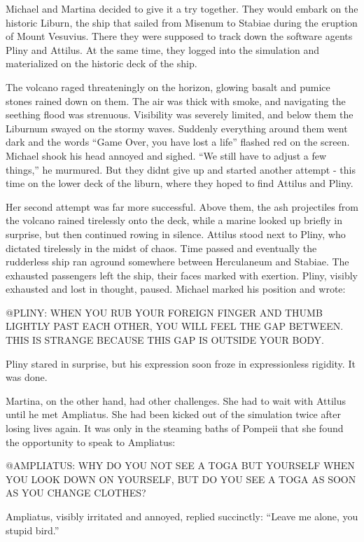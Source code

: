 \documentclass[
]{article}
\begin{document}
Michael and Martina decided to give it a try together. They would embark
on the historic Liburn, the ship that sailed from Misenum to Stabiae
during the eruption of Mount Vesuvius. There they were supposed to track
down the software agents Pliny and Attilus. At the same time, they
logged into the simulation and materialized on the historic deck of the
ship.

The volcano raged threateningly on the horizon, glowing basalt and
pumice stones rained down on them. The air was thick with smoke, and
navigating the seething flood was strenuous. Visibility was severely
limited, and below them the Liburnum swayed on the stormy waves.
Suddenly everything around them went dark and the words ``Game Over, you
have lost a life'' flashed red on the screen. Michael shook his head
annoyed and sighed. ``We still have to adjust a few things,'' he
murmured. But they didn\textquotesingle t give up and started another
attempt - this time on the lower deck of the liburn, where they hoped to
find Attilus and Pliny.

Her second attempt was far more successful. Above them, the ash
projectiles from the volcano rained tirelessly onto the deck, while a
marine looked up briefly in surprise, but then continued rowing in
silence. Attilus stood next to Pliny, who dictated tirelessly in the
midst of chaos. Time passed and eventually the rudderless ship ran
aground somewhere between Herculaneum and Stabiae. The exhausted
passengers left the ship, their faces marked with exertion. Pliny,
visibly exhausted and lost in thought, paused. Michael marked his
position and wrote:

@PLINY: WHEN YOU RUB YOUR FOREIGN FINGER AND THUMB LIGHTLY PAST EACH
OTHER, YOU WILL FEEL THE GAP BETWEEN. THIS IS STRANGE BECAUSE THIS GAP
IS OUTSIDE YOUR BODY.

Pliny stared in surprise, but his expression soon froze in
expressionless rigidity. It was done.

Martina, on the other hand, had other challenges. She had to wait with
Attilus until he met Ampliatus. She had been kicked out of the
simulation twice after losing lives again. It was only in the steaming
baths of Pompeii that she found the opportunity to speak to Ampliatus:

@AMPLIATUS: WHY DO YOU NOT SEE A TOGA BUT YOURSELF WHEN YOU LOOK DOWN ON
YOURSELF, BUT DO YOU SEE A TOGA AS SOON AS YOU CHANGE CLOTHES?

Ampliatus, visibly irritated and annoyed, replied succinctly: ``Leave me
alone, you stupid bird.''
\end{document}
